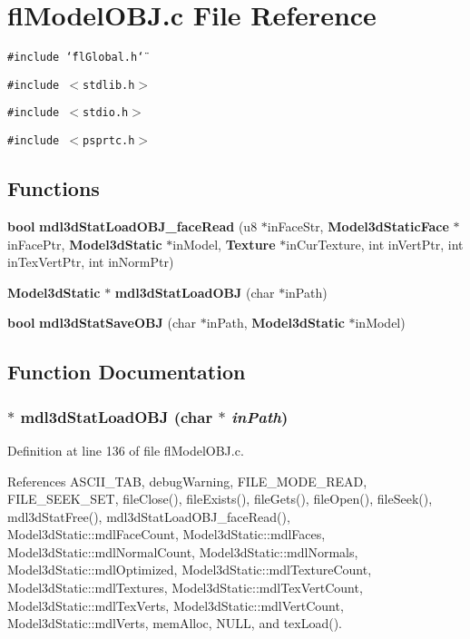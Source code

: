 \section{fl\-Model\-OBJ.c File Reference}
\label{flModelOBJ_8c}
{\tt \#include \char`\"{}fl\-Global.h\char`\"{}}\par
{\tt \#include $<$stdlib.h$>$}\par
{\tt \#include $<$stdio.h$>$}\par
{\tt \#include $<$psprtc.h$>$}\par
\subsection*{Functions}
\begin{CompactItemize}
\item 
{\bf bool} {\bf mdl3d\-Stat\-Load\-OBJ\_\-face\-Read} (u8 $\ast$in\-Face\-Str, {\bf Model3d\-Static\-Face} $\ast$in\-Face\-Ptr, {\bf Model3d\-Static} $\ast$in\-Model, {\bf Texture} $\ast$in\-Cur\-Texture, int in\-Vert\-Ptr, int in\-Tex\-Vert\-Ptr, int in\-Norm\-Ptr)
\item 
{\bf Model3d\-Static} $\ast$ {\bf mdl3d\-Stat\-Load\-OBJ} (char $\ast$in\-Path)
\item 
{\bf bool} {\bf mdl3d\-Stat\-Save\-OBJ} (char $\ast$in\-Path, {\bf Model3d\-Static} $\ast$in\-Model)
\end{CompactItemize}


\subsection{Function Documentation}
\subsubsection{$\ast$ mdl3d\-Stat\-Load\-OBJ (char $\ast$ {\em in\-Path})}\label{flModelOBJ_8c_da03a66f7027e134ce6d14f0f73149d5}




Definition at line 136 of file fl\-Model\-OBJ.c.

References ASCII\_\-TAB, debug\-Warning, FILE\_\-MODE\_\-READ, FILE\_\-SEEK\_\-SET, file\-Close(), file\-Exists(), file\-Gets(), file\-Open(), file\-Seek(), mdl3d\-Stat\-Free(), mdl3d\-Stat\-Load\-OBJ\_\-face\-Read(), Model3d\-Static::mdl\-Face\-Count, Model3d\-Static::mdl\-Faces, Model3d\-Static::mdl\-Normal\-Count, Model3d\-Static::mdl\-Normals, Model3d\-Static::mdl\-Optimized, Model3d\-Static::mdl\-Texture\-Count, Model3d\-Static::mdl\-Textures, Model3d\-Static::mdl\-Tex\-Vert\-Count, Model3d\-Static::mdl\-Tex\-Verts, Model3d\-Static::mdl\-Vert\-Count, Model3d\-Static::mdl\-Verts, mem\-Alloc, NULL, and tex\-Load().

